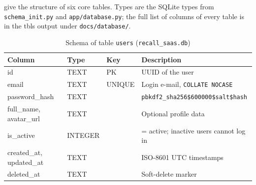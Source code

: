 
 give the structure of six core
tables. Types are the SQLite types from \texttt{schema\_init.py} and
\texttt{app/database.py}; the full list of columns of every table is in the tbls output
under \texttt{docs/database/}.

\begin{table}[htbp]
\centering\small
\caption{Schema of table \texttt{users} (\texttt{recall\_saas.db})}\label{tab:schema_users}
\begin{tabularx}{\textwidth}{@{}>{\raggedright\arraybackslash}p{} >{\raggedright\arraybackslash}p{} >{\raggedright\arraybackslash}p{} >{\raggedright\arraybackslash}X@{}}
\toprule
\textbf{Column} & \textbf{Type} & \textbf{Key} & \textbf{Description}\\
\midrule
id & TEXT & PK & UUID of the user\\
email & TEXT & UNIQUE & Login e-mail, \texttt{COLLATE NOCASE}\\
password\_hash & TEXT & & \texttt{pbkdf2\_sha256\$600000\$salt\$hash}\\
full\_name, avatar\_url & TEXT & & Optional profile data\\
is\_active & INTEGER & & 1 = active; inactive users cannot log in\\
created\_at, updated\_at & TEXT & & ISO-8601 UTC timestamps\\
deleted\_at & TEXT & & Soft-delete marker\\
\bottomrule
\end{tabularx}
\end{table}

